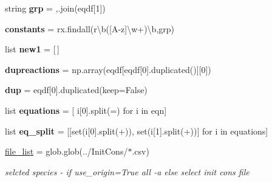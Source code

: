 \begin{DoxyCompactItemize}
\mbox{\label{namespaceMCM__subset_af894333cf3057e35a90d8b0cfb092107}} 
string {\bfseries grp} = \textquotesingle{},\textquotesingle{}.join(eqdf\mbox{[}1\mbox{]})
\item 
\mbox{\label{namespaceMCM__subset_a001a9041e9f940d6e35b92d52e174c83}} 
{\bfseries constants} = rx.\+findall(r\textquotesingle{}\textbackslash{}b(\mbox{[}A-\/z\mbox{]}\textbackslash{}w+)\textbackslash{}b\textquotesingle{},grp)
\item 
\mbox{\label{namespaceMCM__subset_af76d4943f2c9562b99c80dc7521a4798}} 
list {\bfseries new1} = \mbox{[}$\,$\mbox{]}
\item 
\mbox{\label{namespaceMCM__subset_ae56758b4f93909f3e72e116965a57771}} 
{\bfseries dupreactions} = np.\+array(eqdf\mbox{[}eqdf\mbox{[}0\mbox{]}.duplicated()\mbox{]}\mbox{[}0\mbox{]})
\item 
\mbox{\label{namespaceMCM__subset_a7443d63ca810dc496f1fe014e9b13252}} 
{\bfseries dup} = eqdf\mbox{[}0\mbox{]}.duplicated(keep=False)
\item 
\mbox{\label{namespaceMCM__subset_ad80da31b597ee18c4c4daff0693c184b}} 
list {\bfseries equations} = \mbox{[} i\mbox{[}0\mbox{]}.split(\textquotesingle{}=\textquotesingle{}) for i in eqn\mbox{]}
\item 
\mbox{\label{namespaceMCM__subset_a1b27aea0c13434907615081e43aa0f36}} 
list {\bfseries eq\+\_\+split} = \mbox{[}\mbox{[}set(i\mbox{[}0\mbox{]}.split(\textquotesingle{}+\textquotesingle{})), set(i\mbox{[}1\mbox{]}.split(\textquotesingle{}+\textquotesingle{}))\mbox{]} for i in equations\mbox{]}
\item 
\mbox{\label{namespaceMCM__subset_a4945e4d417c749a704dc9fea077266f5}} 
\mbox{\hyperlink{namespaceMCM__subset_a4945e4d417c749a704dc9fea077266f5}{file\+\_\+list}} = glob.\+glob(\textquotesingle{}../Init\+Cons/$\ast$.csv\textquotesingle{})
\begin{DoxyCompactList}\small\item\em selcted species -\/ if use\+\_\+origin=True all -\/a else select init cons file \end{DoxyCompactList}\item 

\end{DoxyCompactItemize}
